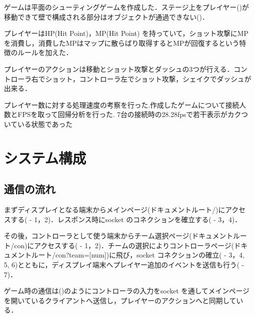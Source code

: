 ゲームは平面のシューティングゲームを作成した．ステージ上をプレイヤー()が移動できて壁で構成される部分はオブジェクトが通過できない()．

プレイヤーはHP(Hit Point)，MP(Hit Point) を持っていて，ショット攻撃にMPを消費し，消費したMPはマップに散らばり取得するとMPが回復するという特徴のルールを加えた．

プレイヤーのアクションは移動とショット攻撃とダッシュの3つが行える．コントローラ右でショット，コントローラ左でショット攻撃，シェイクでダッシュが出来る．

プレイヤー数に対する処理速度の考察を行った.作成したゲームについて接続人数とFPSを取って回帰分析を行った.
7台の接続時の28.28fpsで若干表示がカクついている状態であった



\newpage
\section{システム構成}
\subsection{通信の流れ}
まずディスプレイとなる端末からメインページ(ドキュメントルート/)にアクセスする( - 1，2)．レスポンス時にsocket のコネクションを確立する( - 3，4)．

その後，コントローラとして使う端末からチーム選択ページ(ドキュメントルート/con)にアクセスする( - 1，2)．チームの選択によりコントローラページ(ドキュメントルート/con?team=[num])に飛び，socket コネクションの確立( - 3，4, 5, 6)とともに，ディスプレイ端末へプレイヤー追加のイベントを送信も行う( - 7)．

ゲーム時の通信は()のようにコントローラの入力をsocket を通してメインページを開いているクライアントへ送信し，プレイヤーのアクションへと同期している．



